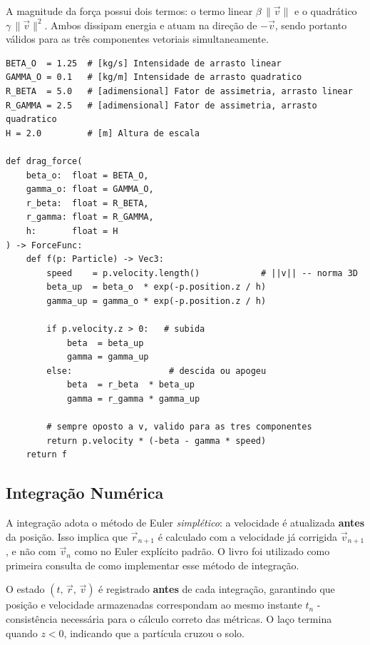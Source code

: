 A magnitude da força possui dois termos: o termo linear $\beta\,\|\vec{v}\|$ e o quadrático $\gamma\,\|\vec{v}\|^2$. Ambos dissipam energia e atuam na direção de $-\vec{v}$, sendo portanto válidos para as três componentes vetoriais simultaneamente.

\begin{lstlisting}[caption={Força de arrasto como closure - seleção de regime pelo estado $v_z$}, label={lst:ars}]
BETA_O  = 1.25  # [kg/s] Intensidade de arrasto linear
GAMMA_O = 0.1   # [kg/m] Intensidade de arrasto quadratico
R_BETA  = 5.0   # [adimensional] Fator de assimetria, arrasto linear
R_GAMMA = 2.5   # [adimensional] Fator de assimetria, arrasto quadratico
H = 2.0         # [m] Altura de escala

def drag_force(
    beta_o:  float = BETA_O,
    gamma_o: float = GAMMA_O,
    r_beta:  float = R_BETA,
    r_gamma: float = R_GAMMA,
    h:       float = H
) -> ForceFunc:
    def f(p: Particle) -> Vec3:
        speed    = p.velocity.length()            # ||v|| -- norma 3D
        beta_up  = beta_o  * exp(-p.position.z / h)
        gamma_up = gamma_o * exp(-p.position.z / h)

        if p.velocity.z > 0:   # subida
            beta  = beta_up
            gamma = gamma_up
        else:                   # descida ou apogeu
            beta  = r_beta  * beta_up
            gamma = r_gamma * gamma_up

        # sempre oposto a v, valido para as tres componentes
        return p.velocity * (-beta - gamma * speed)
    return f
\end{lstlisting}

\subsection{Integração Numérica}
\label{subsec:integracao}

A integração adota o método de Euler \emph{simplético}: a velocidade é atualizada \textbf{antes} da posição. Isso implica que $\vec{r}_{n+1}$ é calculado com a velocidade já corrigida $\vec{v}_{n+1}$, e não com $\vec{v}_n$ como no Euler explícito padrão. O livro \cite{kulp-pagonis-cm-2020} foi utilizado como primeira consulta de como implementar esse método de integração.

O estado $(t,\,\vec{r},\,\vec{v})$ é registrado \textbf{antes} de cada integração, garantindo que posição e velocidade armazenadas correspondam ao mesmo instante $t_n$ - consistência necessária para o cálculo correto das métricas. O laço termina quando $z < 0$, indicando que a partícula cruzou o solo.

